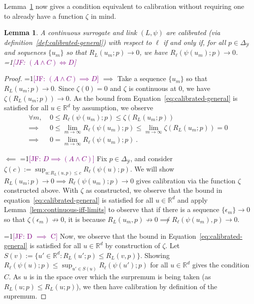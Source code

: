 \documentclass{article}
\newcommand{\Comments}{1}
\newcommand{\mynote}[2]{\ifnum\Comments=1\textcolor{#1}{#2}\fi}
\newcommand{\jessie}[1]{\mynote{purple}{[JF: #1]}}
\newcommand{\reals}{\mathbb{R}}
\newcommand{\simplex}{\Delta_\Y}
\newcommand{\Y}{\mathcal{Y}}
\newtheorem{lemma}{Lemma}
\begin{document}
Lemma~\ref{lem:calib-converging-regrets} now gives a condition equivalent to calibration without requiring one to already have a function $\zeta$ in mind.
\begin{lemma}\label{lem:calib-converging-regrets}
	A continuous surrogate and link $(L,\psi)$ are calibrated (via definition~\ref{def:calibrated-general}) with respect to $\ell$ if and only if, for all $p \in \simplex$ and sequences $\{u_m\}$ so that $R_L(u_m; p) \to 0$, we have $R_\ell(\psi(u_m); p) \to 0$.
	\jessie{$(A \wedge C) \iff D$}
\end{lemma}
\begin{proof}
\jessie{$(A \wedge C) \implies D$}
	$\implies$ Take a sequence $\{u_m\}$ so that $R_L(u_m;p) \to 0$.
	Since $\zeta(0) = 0$ and $\zeta$ is continuous at $0$, we have $\zeta(R_L(u_m;p)) \to 0$.
	As the bound from Equation~\eqref{eq:calibrated-general} is satisfied for all $u \in \reals^d$ by assumption, we observe
	\begin{align*}
	\forall m, \; &0 \leq R_\ell(\psi(u_m); p) \leq \zeta(R_L(u_m;p))\\
	\implies &0 \leq \lim_{m \to \infty} R_\ell(\psi(u_m); p) \leq \lim_{m \to \infty} \zeta(R_L(u_m;p)) = 0\\
	\implies &0 = \lim_{m\to\infty} R_\ell(\psi(u_m); p) ~.~
	\end{align*}
	
	
	$\impliedby$ 
\jessie{$D \implies (A \wedge C)$}
	Fix $p \in \simplex$, and consider $\zeta(c) := \sup_{u: R_L(u,p) \leq c} R_\ell(\psi(u); p)$.  
	We will show $R_L(u_m; p) \to 0 \implies R_\ell(\psi(u_m); p) \to 0$ gives calibration via the function $\zeta$ constructed above. 
	With $\zeta$ as constructed, we observe that the bound in equation~\eqref{eq:calibrated-general} is satisfied for all $u \in \reals^d$ and apply Lemma~\ref{lem:continuous-iff-limits} to observe that if there is a sequence $\{\epsilon_m\} \to 0$ so that $\zeta(\epsilon_m) \not \to 0$, it is because $R_L(u_m, p) \not \to 0 \not\implies R_\ell(\psi(u_m), p) \to 0$.
	

\jessie{D $\implies$ C}
Now, we observe that the bound in Equation~\eqref{eq:calibrated-general} is satisfied for all $u \in \reals^d$ by construction of $\zeta$.
Let $S(v) := \{u' \in \reals^d : R_L(u';p) \leq R_L(v,p) \}$.
Showing $R_\ell(\psi(u);p) \leq \sup_{u' \in S(u)} R_\ell(\psi(u') ; p)$ for all $u \in \reals^d$ gives the condition $C$.
As $u$ is in the space over which the surpremum is being taken (as $R_L(u;p) \leq R_L(u;p)$), we then have calibration by definition of the supremum.


\end{proof}
\end{document}
